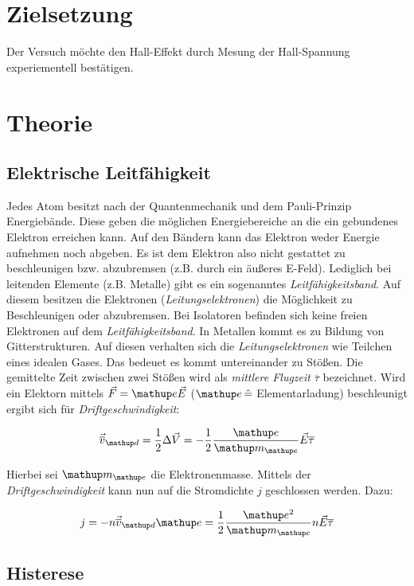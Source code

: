 \section*{Zielsetzung}
Der Versuch möchte den Hall-Effekt durch Mesung der 
Hall-Spannung experiementell bestätigen.

\section{Theorie}

\subsection{Elektrische Leitfähigkeit}
Jedes Atom besitzt nach der Quantenmechanik und dem Pauli-Prinzip 
Energiebände.
Diese geben die möglichen Energiebereiche an die ein gebundenes Elektron 
erreichen kann. Auf den Bändern kann das Elektron weder 
Energie aufnehmen noch abgeben. Es ist dem Elektron also 
nicht gestattet zu beschleunigen bzw. abzubremsen (z.B. durch ein äußeres E-Feld).
Lediglich bei leitenden Elemente (z.B. Metalle) gibt es ein sogenanntes \emph{Leitfähigkeitsband}.
Auf diesem besitzen die Elektronen (\emph{Leitungselektronen}) die Möglichkeit zu Beschleunigen oder abzubremsen.
Bei Isolatoren befinden sich keine freien Elektronen auf dem \emph{Leitfähigkeitsband}.
In Metallen kommt es zu Bildung von Gitterstrukturen. 
Auf diesen verhalten sich die \emph{Leitungselektronen} wie Teilchen eines idealen Gases.
Das bedeuet es kommt untereinander zu Stößen.
Die gemittelte Zeit zwischen zwei Stößen wird als \emph{mittlere Flugzeit} $\overline{\tau}$ bezeichnet.
Wird ein Elektorn mittels $\vec{F}=\map{e}\vec{E}$ ($\map{e}\, \hat{=}$ Elementarladung) beschleunigt 
ergibt sich für \emph{Driftgeschwindigkeit}:

\begin{equation}
\label{eq:drift_v}
\vec{\overline{v}}\ua{d}=\frac{1}{2}\Delta\vec{V}=-\frac{1}{2}\frac{\map{e}}{\map{m}\ua{e}}\vec{E}\overline{\tau}
\end{equation}

Hierbei sei $\map{m}\ua{e}$ die Elektronenmasse.
Mittels der \emph{Driftgeschwindigkeit} kann nun auf die Stromdichte $j$ geschlossen werden. Dazu:

\begin{equation}
\label{eq:stromdicht}
j=-n\vec{\overline{v}}\ua{d}\map{e}=\frac{1}{2}\frac{\map{e^2}}{\map{m}\ua{e}}n\vec{E}\overline{\tau}
\end{equation}

\subsection{Histerese}
